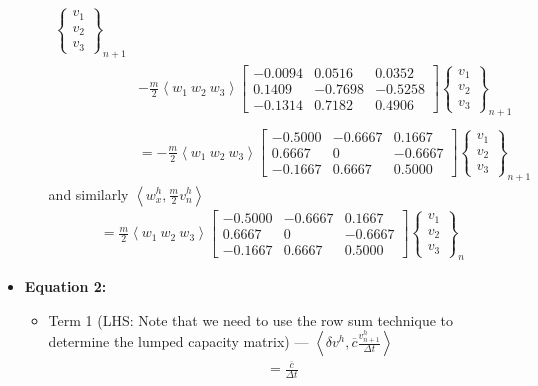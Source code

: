 \begin{itemize}
\begin{itemize}
\begin{align*}
\begin{Bmatrix}
v_1\\v_2\\v_3
\end{Bmatrix}_{n+1} \\
& -\frac{m}{2}\left< w_1\ w_2\ w_3
\right>
\begin{bmatrix}
-0.0094  &  0.0516 &   0.0352\\
    0.1409 &  -0.7698 &  -0.5258\\
   -0.1314  &  0.7182 &  0.4906
\end{bmatrix}\begin{Bmatrix}
v_1\\v_2\\v_3
\end{Bmatrix}_{n+1} \\ \\
& = 
-\frac{m}{2}\left< w_1\ w_2\ w_3
\right>
\begin{bmatrix}
 -0.5000 &  -0.6667  &  0.1667\\
    0.6667   &      0  & -0.6667\\
   -0.1667  &  0.6667  &  0.5000
\end{bmatrix}\begin{Bmatrix}
v_1\\v_2\\v_3
\end{Bmatrix}_{n+1}
\end{align*}
and similarly $\left<
w^h_x, \frac{m}{2} v^h_{n}
\right>$
\begin{align*}
& = 
\frac{m}{2}\left< w_1\ w_2\ w_3
\right>
\begin{bmatrix}
 -0.5000 &  -0.6667  &  0.1667\\
    0.6667   &      0  & -0.6667\\
   -0.1667  &  0.6667  &  0.5000
\end{bmatrix}\begin{Bmatrix}
v_1\\v_2\\v_3
\end{Bmatrix}_{n}
\end{align*}
\end{itemize}
\item {\bf Equation 2: }
\begin{itemize}
\item Term 1 (LHS: Note that we need to use the row sum technique to determine the lumped capacity matrix) --- $\left<
\delta v^h , \overline{c}\frac{v^h_{n+1}}{\Delta t}
\right>$
\begin{align*}
& =  \frac{\overline{c}}{\Delta t}

\end{align*}
\end{itemize}
\end{itemize}
